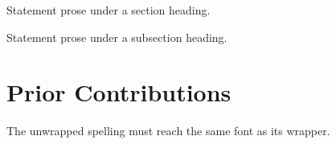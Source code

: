 \documentclass{careerdossier-statement}
\begin{document}

Statement prose under a section heading.


Statement prose under a subsection heading.

\section*{\cdossiertestSectionFont Prior Contributions}

The unwrapped spelling must reach the same font as its wrapper.
\end{document}
